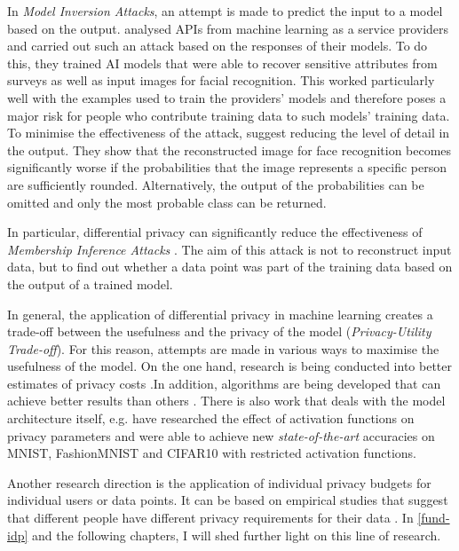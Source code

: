 In \textit{Model Inversion Attacks}, an attempt is made to predict the input to a model based on the output. \textcite{fredrikson:2015} analysed APIs from machine learning as a service providers and carried out such an attack based on the responses of their models. To do this, they trained AI models that were able to recover sensitive attributes from surveys as well as input images for facial recognition. 
This worked particularly well with the examples used to train the providers' models and therefore poses a major risk for people who contribute training data to such models' training data. To minimise the effectiveness of the attack, \citeauthor{fredrikson:2015} suggest reducing the level of detail in the output. They show that the reconstructed image for face recognition becomes significantly worse if the probabilities that the image represents a specific person are sufficiently rounded. Alternatively, the output of the probabilities can be omitted and only the most probable class can be returned.

In particular, differential privacy can significantly reduce the effectiveness of \textit{Membership Inference Attacks}\cite{shokri:2017} \cite[p.14f]{chang:2023}. The aim of this attack is not to reconstruct input data, but to find out whether a data point was part of the training data based on the output of a trained model.

In general, the application of differential privacy in machine learning creates a trade-off between the usefulness and the privacy of the model (\textit{Privacy-Utility Trade-off}). For this reason, attempts are made in various ways to maximise the usefulness of the model. On the one hand, research is being conducted into better estimates of privacy costs \cite{dwork:2010, abadi:2016, mironov:2019}.In addition, algorithms are being developed that can achieve better results than others \cite{papernot:2017}. There is also work that deals with the model architecture itself, e.g. \textcite{papernot:2021} have researched the effect of activation functions on privacy parameters and were able to achieve new \textit{state-of-the-art} accuracies on MNIST, FashionMNIST and CIFAR10 with restricted activation functions.

Another research direction is the application of individual privacy budgets for individual users or data points. It can be based on empirical studies that suggest that different people have different privacy requirements for their data \cite{jensen:2005, acquisti:2005}. In \autoref{fund-idp} and the following chapters, I will shed further light on this line of research.

